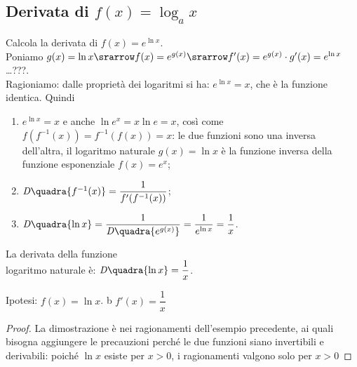 \subsection{Derivata di $f(x)=\log_a x$}
\label{}
\begin{esempio}
  Calcola la derivata di $f(x)=e^{\ln x}$.\\
  Poniamo $g(x)=\ln x\srarrow f(x)=e^{g(x)}\srarrow f'(x)=e^{g(x)}\cdot g'(x)=
  e^{\ln x}$ \dots ???.\\
  Ragioniamo: dalle proprietà
  dei logaritmi si ha: $e^{\ln x} =x$, che è la funzione identica. Quindi
  \begin{enumerate}[noitemsep]
    \item $e^{\ln x} =x$ e anche $\ln e^x= x\ln e=x$, così come 
    $f(f^{-1}(x))=f^{-1}(f(x))=x$: le due funzioni sono una inversa dell'altra,
    il logaritmo naturale $g(x)=\ln x$ è la funzione inversa della
    funzione esponenziale $f(x)=e^x$;
    \item $\mathit{D}\quadra{f^{-1}(x)}=\dfrac{1}{f'(f^{-1}(x))}$;
    \item $\mathit{D}\quadra{\ln x}=\dfrac{1}{\mathit{D}\quadra{e^{g(x)}}}
    =\dfrac{1}{e^{\ln x}}=\dfrac{1}{x}$.
  \end{enumerate}
\end{esempio}

\begin{inaccessibleblock}
  \begin{minipage}[]{.55\textwidth}
   \begin{center} \esplog \end{center}
 \end{minipage} 
  \hfill
 \begin{minipage}[]{.42\textwidth}
 \begin{teorema}
  La derivata della funzione \\
  logaritmo naturale è: $\mathit{D}\quadra{\ln x}=
  \dfrac{1}{x}$.
\end{teorema}
\noindent Ipotesi: $f(x)=\ln x$. \hspace{1cm}b $f'(x)=\dfrac{1}{x}$
\begin{proof}
La dimostrazione è nei ragionamenti dell'esempio precedente, ai quali bisogna 
aggiungere le precauzioni perché le due funzioni siano invertibili e derivabili: 
poiché $\ln x$ esiste per $x>0$, i ragionamenti valgono solo per $x>0$
\end{proof} 
 \end{minipage}
\end{inaccessibleblock}
\label{}
\\

